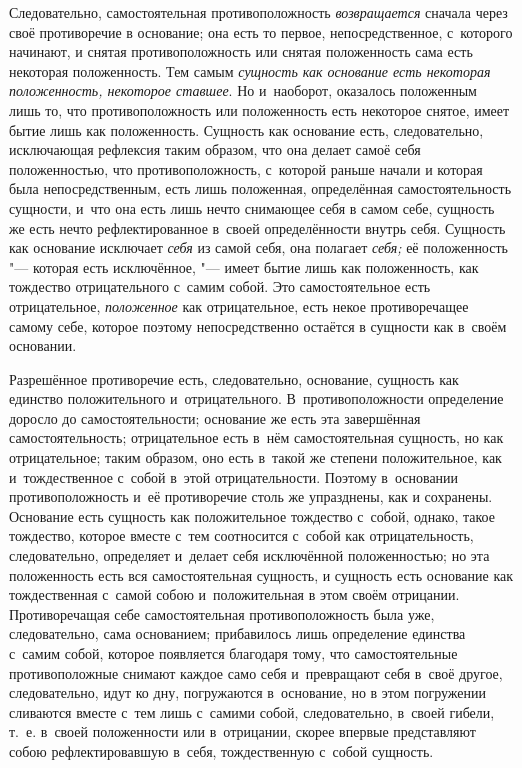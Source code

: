 Следовательно, самостоятельная противоположность
{\em возвращается} сначала через своё противоречие в
основание; она есть то первое, непосредственное, с~которого начинают, и
снятая противоположность или снятая положенность сама есть некоторая
положенность. Тем самым {\em сущность как основание
есть некоторая положенность, некоторое ставшее}. Но и~наоборот, оказалось
положенным лишь то, что противоположность или положенность есть некоторое
снятое, имеет бытие лишь как положенность. Сущность как основание есть,
следовательно, исключающая рефлексия таким образом, что она делает самоё
себя положенностью, что противоположность, с~которой раньше начали и
которая была непосредственным, есть лишь положенная, определённая
самостоятельность сущности, и~что она есть лишь нечто снимающее себя в
самом себе, сущность же есть нечто рефлектированное в~своей определённости
внутрь себя. Сущность как основание исключает
{\em себя} из самой себя, она полагает
{\em себя;} её положенность "--- которая есть исключённое,
"--- имеет бытие лишь как положенность, как тождество отрицательного с~самим
собой. Это самостоятельное есть отрицательное,
{\em положенное} как отрицательное, есть некое
противоречащее самому себе, которое поэтому непосредственно остаётся в
сущности как в~своём основании.

Разрешённое противоречие есть, следовательно, основание, сущность как
единство положительного и~отрицательного. В~противоположности определение
доросло до самостоятельности; основание же есть эта завершённая
самостоятельность; отрицательное есть в~нём самостоятельная сущность, но
как отрицательное; таким образом, оно есть в~такой же степени
положительное, как и~тождественное с~собой в~этой отрицательности. Поэтому
в~основании противоположность и~её противоречие столь же упразднены, как и
сохранены. Основание есть сущность как положительное тождество с~собой,
однако, такое тождество, которое вместе с~тем соотносится с~собой как
отрицательность, следовательно, определяет и~делает себя исключённой
положенностью; но эта положенность есть вся самостоятельная сущность, и
сущность есть основание как тождественная с~самой собою и~положительная в
этом своём отрицании. Противоречащая себе самостоятельная противоположность
была уже, следовательно, сама основанием; прибавилось лишь определение
единства с~самим собой, которое появляется благодаря тому, что
самостоятельные противоположные снимают каждое само себя и~превращают себя
в~своё другое, следовательно, идут ко дну, погружаются в~основание, но в
этом погружении сливаются вместе с~тем лишь с~самими собой, следовательно,
в~своей гибели, т.~е. в~своей положенности или в~отрицании, скорее впервые
представляют собою рефлектировавшую в~себя, тождественную с~собой сущность.

